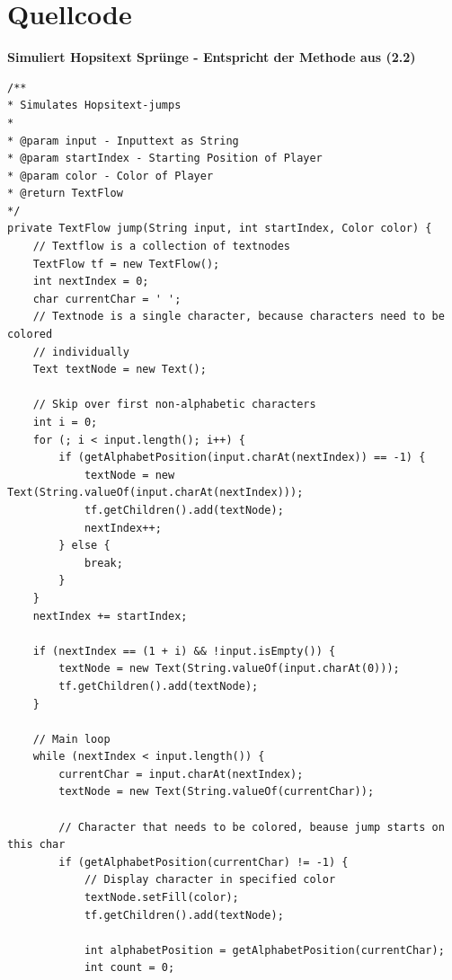 \documentclass[a4paper,10pt,ngerman]{scrartcl}
\begin{document}
\section{Quellcode}
\textbf{Simuliert Hopsitext Sprünge - Entspricht der Methode aus (2.2)}
\newline
\begin{lstlisting}
/** 
* Simulates Hopsitext-jumps
* 
* @param input - Inputtext as String
* @param startIndex - Starting Position of Player
* @param color - Color of Player
* @return TextFlow
*/
private TextFlow jump(String input, int startIndex, Color color) {
    // Textflow is a collection of textnodes
    TextFlow tf = new TextFlow();
    int nextIndex = 0;
    char currentChar = ' ';
    // Textnode is a single character, because characters need to be colored
    // individually
    Text textNode = new Text();

    // Skip over first non-alphabetic characters
    int i = 0;
    for (; i < input.length(); i++) {
        if (getAlphabetPosition(input.charAt(nextIndex)) == -1) {
            textNode = new Text(String.valueOf(input.charAt(nextIndex)));
            tf.getChildren().add(textNode);
            nextIndex++;
        } else {
            break;
        }
    }
    nextIndex += startIndex;

    if (nextIndex == (1 + i) && !input.isEmpty()) {
        textNode = new Text(String.valueOf(input.charAt(0)));
        tf.getChildren().add(textNode);
    }

    // Main loop
    while (nextIndex < input.length()) {
        currentChar = input.charAt(nextIndex);
        textNode = new Text(String.valueOf(currentChar));

        // Character that needs to be colored, beause jump starts on this char
        if (getAlphabetPosition(currentChar) != -1) {
            // Display character in specified color
            textNode.setFill(color);
            tf.getChildren().add(textNode);

            int alphabetPosition = getAlphabetPosition(currentChar);
            int count = 0;


\end{lstlisting}
\end{document}
